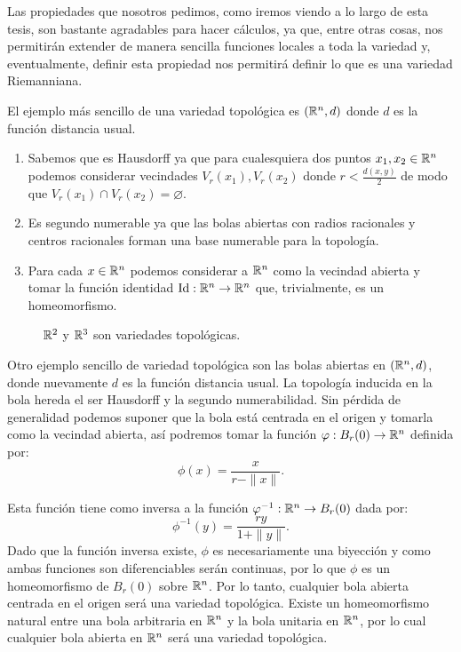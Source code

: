 Las propiedades que nosotros pedimos, como iremos viendo a lo largo de esta tesis, son bastante agradables para hacer cálculos, ya que, entre otras cosas, nos permitirán extender de manera sencilla funciones locales a toda la variedad y, eventualmente, definir esta propiedad nos permitirá definir lo que es una variedad Riemanniana.


\begin{example}\label{Ex: Variedad Topologica - Espacios Euclidianos}
	El ejemplo más sencillo de una variedad topológica es $(\mathbb{R}^n,d)$ donde $d$ es la función distancia usual.
	\begin{enumerate}
		\item Sabemos que es Hausdorff ya que para cualesquiera dos puntos $x_1,x_2 \in \mathbb{R}^n$ podemos considerar vecindades $V_r(x_1), V_r(x_2)$ donde $r < \frac{d(x,y)}{2}$ de modo que $V_r(x_1) \cap V_r(x_2) = \varnothing$.
		\item Es segundo numerable ya que las bolas abiertas con radios racionales y centros racionales forman una base numerable para la topología.
		\item Para cada $x \in \mathbb{R}^n$ podemos considerar a $\mathbb{R}^n$ como la vecindad abierta y tomar la función identidad $\mathrm{Id}: \mathbb{R}^n \to \mathbb{R}^n$ que, trivialmente, es un homeomorfismo.
	\end{enumerate}
\end{example}

\begin{figure}[h]
	\centering
	
	\caption{$\mathbb{R}^2$ y $\mathbb{R}^3$ son variedades topológicas.}
\end{figure}

\begin{example}\label{Ex: Variedad Topologica - Bolas Abiertas}
	Otro ejemplo sencillo de variedad topológica son las bolas abiertas en $(\mathbb{R}^n,d)$, donde nuevamente $d$ es la función distancia usual. La topología inducida en la bola hereda el ser Hausdorff y la segundo numerabilidad. Sin pérdida de generalidad podemos suponer que la bola está centrada en el origen y tomarla como la vecindad abierta, así podremos tomar la función $\varphi: B_r(0) \to \mathbb{R}^n$ definida por:
	\[
		\phi(x) = \frac{x}{r - \|x\|}.
	\]

	Esta función tiene como inversa a la función $\varphi^{-1}: \mathbb{R}^n \to B_r(0)$ dada por:
	\[ \phi^{-1}(y) = \frac{ry}{1 + \|y\|}.
	\]
  Dado que la función inversa existe, $\phi$ es necesariamente una biyección y como ambas funciones son diferenciables serán continuas, por lo que $\phi$ es un homeomorfismo de $B_r(0)$ sobre $\mathbb{R}^n$. Por lo tanto, cualquier bola abierta centrada en el origen será una variedad topológica. Existe un homeomorfismo natural entre una bola arbitraria en $\mathbb{R}^n$ y la bola unitaria en $\mathbb{R}^n$, por lo cual cualquier bola abierta en $\mathbb{R}^n$ será una variedad topológica.
\end{example}

